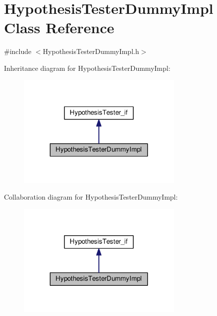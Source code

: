 \hypertarget{class_hypothesis_tester_dummy_impl}{}\section{Hypothesis\+Tester\+Dummy\+Impl Class Reference}
\label{class_hypothesis_tester_dummy_impl}


{\ttfamily \#include $<$Hypothesis\+Tester\+Dummy\+Impl.\+h$>$}



Inheritance diagram for Hypothesis\+Tester\+Dummy\+Impl\+:
\nopagebreak
\begin{figure}[H]
\begin{center}
\leavevmode
\includegraphics[width=227pt]{class_hypothesis_tester_dummy_impl__inherit__graph}
\end{center}
\end{figure}


Collaboration diagram for Hypothesis\+Tester\+Dummy\+Impl\+:
\nopagebreak
\begin{figure}[H]
\begin{center}
\leavevmode
\includegraphics[width=227pt]{class_hypothesis_tester_dummy_impl__coll__graph}
\end{center}
\end{figure}
